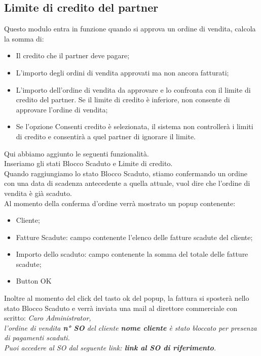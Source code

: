 \subsection{Limite di credito del partner}
Questo modulo entra in funzione quando si approva un ordine di vendita, calcola la somma di:
\begin{itemize}
\item Il credito che il partner deve pagare;
\item L'importo degli ordini di vendita approvati ma non ancora fatturati;
\item L'importo dell'ordine di vendita da approvare e lo confronta con il limite di credito del partner. Se il limite di credito è inferiore, non consente di approvare l'ordine di vendita;
\item Se l'opzione Consenti credito è selezionata, il sistema non controllerà i limiti di credito e consentirà a quel partner di ignorare il limite.
\end{itemize}
\vspace*{0.5cm}
Qui abbiamo aggiunto le seguenti funzionalità.\\
Inseriamo gli stati Blocco Scaduto e Limite di credito.\\
Quando raggiungiamo lo stato Blocco Scaduto, stiamo confermando un ordine con una data di scadenza antecedente a quella attuale, vuol dire che l'ordine di vendita è già scaduto.\\
Al momento della conferma d'ordine verrà mostrato un popup contenente:\\
\begin{itemize}
	\item Cliente;
	\item Fatture Scadute: campo contenente l'elenco delle fatture scadute del cliente;
	\item Importo dello scaduto: campo contenente la somma del totale delle fatture scadute;
	\item Button OK
\end{itemize}

Inoltre al momento del click del tasto ok del popup, la fattura si sposterà nello stato Blocco Scaduto e verrà inviata una mail al direttore commerciale con scritto:\vspace*{0.5cm}
\textit{Caro Administrator,\\
l'ordine di vendita \textbf{n° SO} del cliente \textbf{nome cliente} è stato bloccato per presenza di pagamenti scaduti.\\
Puoi accedere al SO dal seguente link: \textbf{link al SO di riferimento}.}


